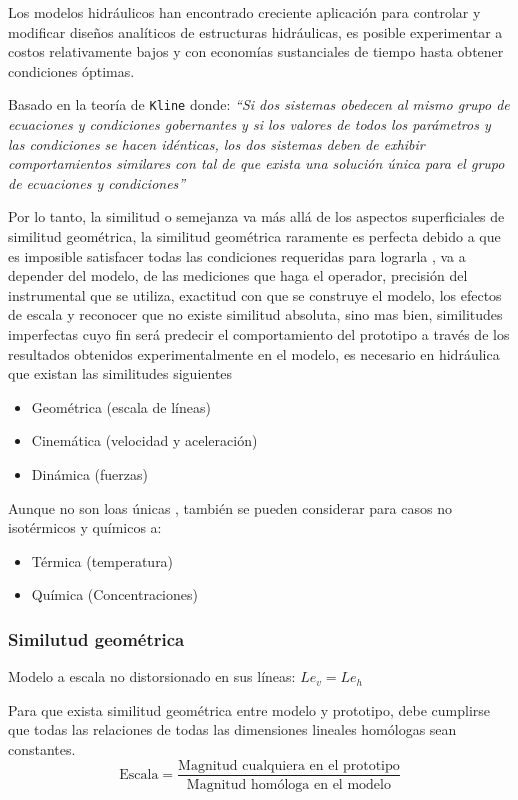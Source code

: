 Los modelos hidráulicos han encontrado creciente aplicación para controlar y modificar diseños analíticos de estructuras hidráulicas, es posible experimentar a costos relativamente bajos y con economías sustanciales de tiempo hasta obtener condiciones óptimas.

Basado en la teoría de \texttt{Kline} donde: \emph{``Si dos sistemas obedecen al mismo grupo de ecuaciones y condiciones gobernantes y si los valores de todos los parámetros y las condiciones se hacen idénticas, los dos sistemas deben de exhibir comportamientos similares con tal de que exista una solución única para el grupo de ecuaciones y condiciones''}

Por lo tanto, la similitud o semejanza va más allá de los aspectos superficiales de similitud geométrica, la similitud geométrica raramente es perfecta debido a que es imposible satisfacer todas las condiciones requeridas para lograrla , va a depender del modelo, de las mediciones que haga el operador, precisión del instrumental que se utiliza, exactitud con que se construye el modelo, los efectos de escala y reconocer que no existe similitud absoluta, sino mas bien, similitudes imperfectas cuyo fin será predecir el comportamiento del prototipo a través de los resultados  obtenidos experimentalmente en el modelo, es necesario en hidráulica que existan las similitudes siguientes

\begin{itemize}
    \item Geométrica (escala de líneas)
    \item Cinemática (velocidad y aceleración)
    \item Dinámica (fuerzas)
\end{itemize}
Aunque no son loas únicas , también se pueden considerar para casos no
isotérmicos y químicos a:
\begin{itemize}
    \item Térmica (temperatura)
    \item Química (Concentraciones)
\end{itemize}
\subsubsection{Similutud geométrica}
Modelo a escala no distorsionado en sus líneas: $Le_v=Le_h$

Para que exista similitud geométrica entre modelo y prototipo, debe cumplirse que
todas las relaciones de todas las dimensiones lineales homólogas sean
constantes.
\begin{equation}
    \text{Escala}=\frac{\text{Magnitud cualquiera en el prototipo}}{\text{Magnitud homóloga en el modelo}}
\end{equation}

